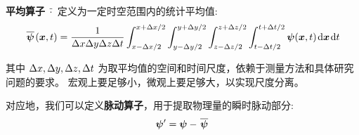 \textbf{平均算子} $\mkern2mu \overline{\cdot} \mkern2mu$ 定义为一定时空范围内的统计平均值:
\begin{equation}
    \mkern2mu \overline{\bm{\psi}} \mkern2mu(\bm{x}, t) = \frac{1}{\Delta x \Delta y \Delta z \Delta t} \int_{x - \Delta x/2}^{x + \Delta x/2} \int_{y - \Delta y/2}^{y + \Delta y/2} \int_{z - \Delta z/2}^{z + \Delta z/2} \int_{t - \Delta t/2}^{t + \Delta t/2} \bm{\psi}(\bm{x}, t) \mkern2mu \mathrm{d} \bm{x} \mkern2mu \mathrm{d} t
    \label{eq:average_definition}
\end{equation}

其中 $\Delta x, \Delta y, \Delta z, \Delta t$ 为取平均值的空间和时间尺度，依赖于测量方法和具体研究问题的要求。
宏观上要足够小，微观上要足够大，以实现尺度分离。

对应地，我们可以定义\textbf{脉动算子}，用于提取物理量的瞬时脉动部分:
\begin{equation}
    \bm{\psi}' = \bm{\psi} - \mkern2mu \overline{\bm{\psi}} \mkern2mu
    \label{eq:fluctuation_definition}
\end{equation}

